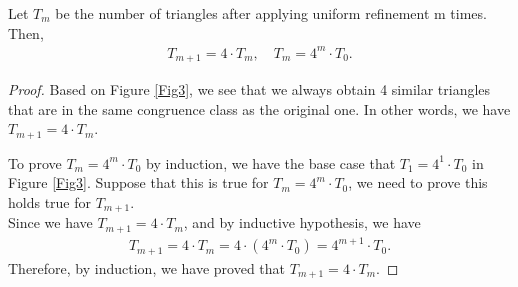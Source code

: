     \begin{lemma}
    Let $T_{m}$ be the number of triangles after applying uniform refinement m times. Then,
    \begin{align*}
    T_{m+1} = 4 \cdot T_{m}, \quad T_{m} = 4^m \cdot T_0.
    \end{align*}
    \label{lma3}
    \end{lemma}
    \begin{proof}
    Based on Figure \ref{Fig3}, we see that we always obtain 4 similar triangles that are in the same congruence class as the original one. In other words, we have $T_{m+1} = 4 \cdot T_{m}$.

    To prove $T_{m} = 4^m \cdot T_0$ by induction, we have the base case that $T_1 = 4^1 \cdot T_0$ in Figure \ref{Fig3}. Suppose that this is true for $T_{m} = 4^m \cdot T_0$, we need to prove this holds true for $T_{m+1}$.\\
    Since we have $T_{m+1} = 4 \cdot T_{m}$, and by inductive hypothesis, we have
    \begin{align*}
    T_{m+1} = 4 \cdot T_{m} = 4 \cdot (4^m\cdot T_0) = 4^{m+1}\cdot T_0.
    \end{align*}
    Therefore, by induction, we have proved that $T_{m+1} = 4 \cdot T_{m}$.
    \end{proof}

